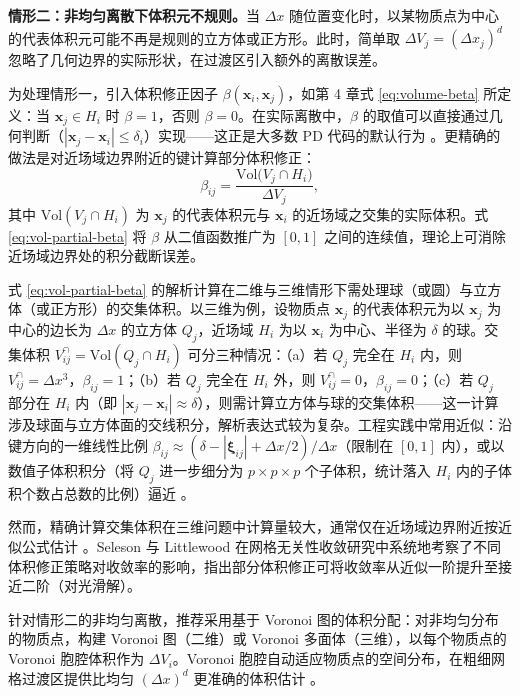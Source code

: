 \textbf{情形二：非均匀离散下体积元不规则。}当 $\Delta x$ 随位置变化时，以某物质点为中心的代表体积元可能不再是规则的立方体或正方形。此时，简单取 $\Delta V_j=(\Delta x_j)^d$ 忽略了几何边界的实际形状，在过渡区引入额外的离散误差。

为处理情形一，引入体积修正因子 $\beta(\mathbf{x}_i,\mathbf{x}_j)$，如第 4 章式 \eqref{eq:volume-beta} 所定义：当 $\mathbf{x}_j\in H_i$ 时 $\beta=1$，否则 $\beta=0$。在实际离散中，$\beta$ 的取值可以直接通过几何判断（$|\mathbf{x}_j-\mathbf{x}_i|\le\delta_i$）实现——这正是大多数 PD 代码的默认行为 \cite{MadenciOterkus2014,Parks2008}。更精确的做法是对近场域边界附近的键计算部分体积修正：
\begin{equation}
  \beta_{ij}=
  \frac{\text{Vol}\bigl(V_j\cap H_i\bigr)}{\Delta V_j},
  \label{eq:vol-partial-beta}
\end{equation}
其中 $\text{Vol}(V_j\cap H_i)$ 为 $\mathbf{x}_j$ 的代表体积元与 $\mathbf{x}_i$ 的近场域之交集的实际体积。式 \eqref{eq:vol-partial-beta} 将 $\beta$ 从二值函数推广为 $[0,1]$ 之间的连续值，理论上可消除近场域边界处的积分截断误差。

式 \eqref{eq:vol-partial-beta} 的解析计算在二维与三维情形下需处理球（或圆）与立方体（或正方形）的交集体积。以三维为例，设物质点 $\mathbf{x}_j$ 的代表体积元为以 $\mathbf{x}_j$ 为中心的边长为 $\Delta x$ 的立方体 $Q_j$，近场域 $H_i$ 为以 $\mathbf{x}_i$ 为中心、半径为 $\delta$ 的球。交集体积 $V_{ij}^{\cap}=\text{Vol}(Q_j\cap H_i)$ 可分三种情况：（a）若 $Q_j$ 完全在 $H_i$ 内，则 $V_{ij}^{\cap}=\Delta x^3$，$\beta_{ij}=1$；（b）若 $Q_j$ 完全在 $H_i$ 外，则 $V_{ij}^{\cap}=0$，$\beta_{ij}=0$；（c）若 $Q_j$ 部分在 $H_i$ 内（即 $|\mathbf{x}_j-\mathbf{x}_i|\approx\delta$），则需计算立方体与球的交集体积——这一计算涉及球面与立方体面的交线积分，解析表达式较为复杂。工程实践中常用近似：沿键方向的一维线性比例 $\beta_{ij}\approx(\delta-|\boldsymbol{\xi}_{ij}|+\Delta x/2)/\Delta x$（限制在 $[0,1]$ 内），或以数值子体积积分（将 $Q_j$ 进一步细分为 $p\times p\times p$ 个子体积，统计落入 $H_i$ 内的子体积个数占总数的比例）逼近 \cite{LeBobaru2018}。

然而，精确计算交集体积在三维问题中计算量较大，通常仅在近场域边界附近按近似公式估计 \cite{LeBobaru2018,SelesonLittlewood2016}。Seleson 与 Littlewood \cite{SelesonLittlewood2016} 在网格无关性收敛研究中系统地考察了不同体积修正策略对收敛率的影响，指出部分体积修正可将收敛率从近似一阶提升至接近二阶（对光滑解）。

针对情形二的非均匀离散，推荐采用基于 Voronoi 图的体积分配：对非均匀分布的物质点，构建 Voronoi 图（二维）或 Voronoi 多面体（三维），以每个物质点的 Voronoi 胞腔体积作为 $\Delta V_i$。Voronoi 胞腔自动适应物质点的空间分布，在粗细网格过渡区提供比均匀 $(\Delta x)^d$ 更准确的体积估计 \cite{Bobaru2009}。

